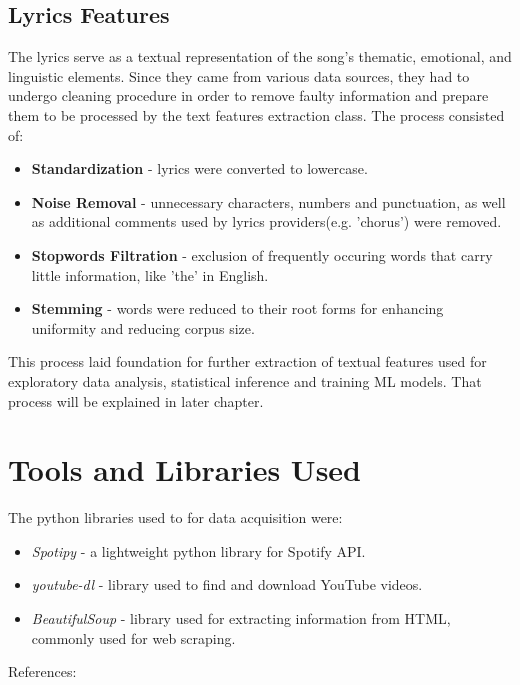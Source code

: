\subsection{Lyrics Features}
 The lyrics serve as a textual representation of the song's thematic,
 emotional, and linguistic elements. Since they came from various data sources,
 they had  to undergo cleaning procedure in order to remove faulty information
 and prepare them to be processed by the text features extraction class. The
 process consisted of:
 \begin{itemize}
  \item \textbf{Standardization} - lyrics were converted to lowercase.
  \item \textbf{Noise Removal} - unnecessary characters, numbers and
    punctuation, as well as additional comments used by lyrics providers(e.g.
    'chorus') were removed.
  \item \textbf{Stopwords Filtration} - exclusion of frequently occuring words
    that carry little information, like 'the' in English.
  \item \textbf{Stemming} - words were reduced to their root forms for enhancing
    uniformity and reducing corpus size.
 \end{itemize}

 This process laid foundation for further extraction of textual features used
 for exploratory data analysis, statistical inference and training ML models.
 That process will be explained in later chapter.



\section{Tools and Libraries Used}
\label{sec:toolsandlibrariesused}
The python libraries used to for data acquisition were:
\begin{itemize}
  \item \textit{Spotipy} - a lightweight python library for
    Spotify API.
  \item \textit{youtube-dl}  - library used to find and download
    YouTube videos.
  \item \textit{BeautifulSoup}  - library used for
    extracting information from HTML, commonly used for web scraping.
\end{itemize}

References: \cite{spotipy} \cite{ytdl} \cite{beautifulsoup}


